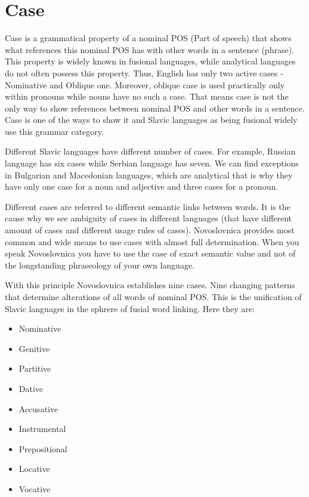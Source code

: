 \section{Case}

Case is a grammatical property of a nominal POS (Part of speech) that shows what references this nominal POS has with other words in a sentence (phrase). This property is widely known in fusional languages, while analytical languages do not often possess this property. Thus, English has only two active cases - Nominative and Oblique one. Moreover, oblique case is used practically only within pronouns while nouns have no such a case. That means case is not the only way to show references between nominal POS and other words in a sentence. Case is one of the ways to show it and Slavic languages as being fusional widely use this grammar category.

Different Slavic languages have different number of cases. For example, Russian language has six cases while Serbian language has seven. We can find exceptions in Bulgarian and Macedonian languages, which are analytical that is why they have only one case for a noun and adjective and three cases for a pronoun.

Different cases are referred to different semantic links between words. It is the cause why we see ambiguity of cases in different languages (that have different amount of cases and different usage rules of cases). Novoslovnica provides most common and wide means to use cases with almost full determination. When you speak Novoslovnica you have to use the case of exact semantic value and not of the longstanding phraseology of your own language.

With this principle Novoslovnica establishes nine cases. Nine changing patterns that determine alterations of all words of nominal POS. This is the unification of Slavic languages in the sphrere of fusial word linking. Here they are:

\begin{itemize}
	\item Nominative
	\item Genitive
	\item Partitive
	\item Dative
	\item Accusative
	\item Instrumental
	\item Prepositional
	\item Locative
	\item Vocative
\end{itemize}

